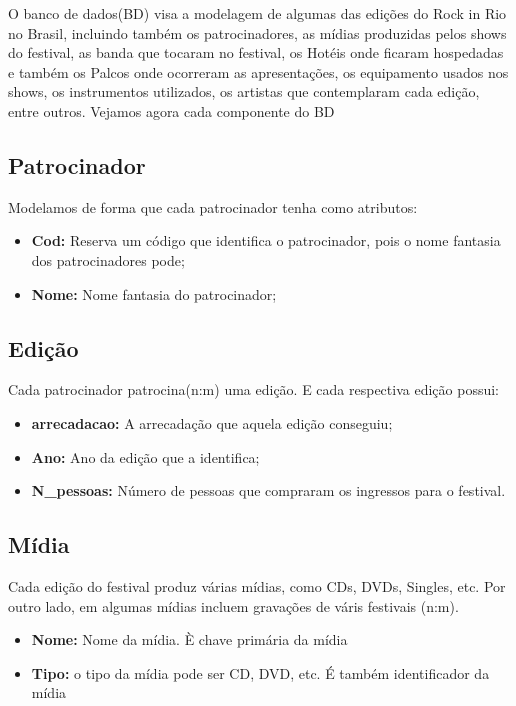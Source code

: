 \documentclass[12pt]{article}
\begin{document}
O banco de dados(BD) visa a modelagem de algumas das edições do Rock in Rio no Brasil, incluindo também os patrocinadores, as mídias produzidas pelos shows do festival, as banda que tocaram no festival, os Hotéis onde ficaram hospedadas e também os Palcos onde ocorreram as apresentações, os equipamento usados nos shows, os instrumentos utilizados, os artistas que contemplaram cada edição, entre outros. Vejamos agora cada componente do BD

\subsection{Patrocinador}

Modelamos de forma que cada patrocinador tenha como atributos:
\begin{itemize}
	\item \textbf{Cod:} Reserva um código que identifica o patrocinador, pois o nome fantasia dos patrocinadores pode;
	\item \textbf{Nome:} Nome fantasia do patrocinador;
\end{itemize}

\subsection{Edição}

Cada patrocinador patrocina(n:m) uma edição. E cada respectiva edição possui:
\begin{itemize}
	\item \textbf{arrecadacao:} A arrecadação que aquela edição conseguiu;
	\item \textbf{Ano:} Ano da edição que a identifica;
	\item \textbf{N\_pessoas:} Número de pessoas que compraram os ingressos para o festival.
\end{itemize}
\subsection{Mídia}

Cada edição do festival produz várias mídias, como CDs, DVDs, Singles, etc. Por outro lado, em algumas mídias incluem gravações de váris festivais (n:m).
\begin{itemize}
\item \textbf{Nome:}  Nome da mídia. È chave primária da mídia
\item \textbf{Tipo:} o tipo da mídia pode ser CD, DVD, etc. É também identificador da mídia
\end{itemize}
\end{document}
